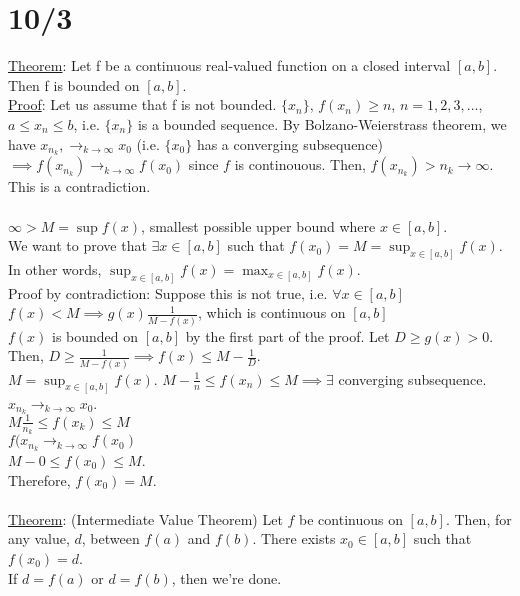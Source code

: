 \documentclass[11pt]{article}
\begin{document}
\section*{10/3}
	\underline{Theorem}: Let f be a continuous real-valued function on a closed interval $[a, b]$. Then f is bounded on $[a,b]$.\\
	\underline{Proof}: Let us assume that f is not bounded. $\{ x_n\}$, $f(x_n) \ge n$, $n = 1, 2, 3, \ldots$, $a \le x_n \le b$, i.e. $\{x_n\}$ is a bounded sequence. By Bolzano-Weierstrass theorem, we have $x_{n_k}, \to_{k \to \infty} x_0$ (i.e. $\{ x_0 \}$ has a converging subsequence) $\implies f(x_{n_k}) \to_{k \to \infty} f(x_0)$ since $f$ is continouous. Then, $f(x_{n_k}) > n_k \to \infty$. This is a contradiction. \\\\
	$\infty > M = \sup f(x)$, smallest possible upper bound where $x \in [a,b]$.\\
	We want to prove that $\exists x \in [a,b]$ such that $f(x_0) = M = \sup_{x \in [a,b]} f(x)$. In other words, $\sup_{x \in [a,b]} f(x) = \max_{x \in [a,b]} f(x)$.\\
	Proof by contradiction: Suppose this is not true, i.e. $\forall x \in [a,b]$ $f(x) < M \implies g(x) \frac{1}{M - f(x)}$, which is continuous on $[a,b]$\\
	$f(x)$ is bounded on $[a,b]$ by the first part of the proof. Let $D \ge g(x) > 0$. Then, $D \ge \frac{1}{M - f(x)} \implies f(x) \le M - \frac{1}{D}$.\\
	$M = \sup_{x \in [a,b]}f(x)$.
	$M - \frac{1}{n} \le f(x_n) \le M \implies \exists$ converging subsequence.\\
	$x_{n_k} \to_{k \to \infty} x_0$.\\
	$M \frac{1}{n_k} \le f(x_k) \le M$\\
	$f(x_{n_k} \to_{k \to \infty} f(x_0)$\\
	$M - 0 \le f(x_0) \le M$.\\
	Therefore, $f(x_0) = M$.\\
	\\
	\underline{Theorem}: (Intermediate Value Theorem) Let $f$ be continuous on
	$[a,b]$. Then, for any value, $d$, between $f(a)$ and $f(b)$. There exists
	$x_0 \in [a,b]$ such that $f(x_0) = d$.\\
	If $d = f(a)$ or $d = f(b)$, then we're done. 
\end{document}
